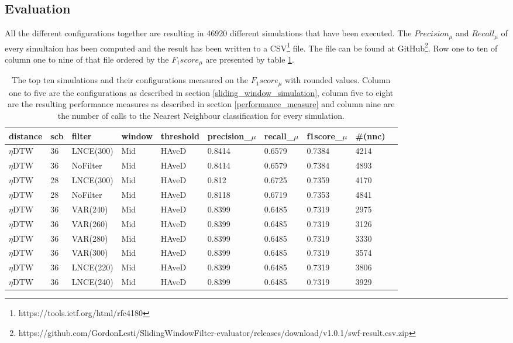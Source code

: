 \subsection{Evaluation} \label{evaluation}
All the different configurations together are resulting in 46920 different simulations that have been executed. The
$Precision_{\mu}$ and $Recall_{\mu}$ of every simultaion has been computed and the result has been written to a
CSV\footnote{https://tools.ietf.org/html/rfc4180} file. The file can be found at
GitHub\footnote{https://github.com/GordonLesti/SlidingWindowFilter-evaluator/releases/download/v1.0.1/swf-result.csv.zip}.
Row one to ten of column one to nine of that file ordered by the $F_{1}score_{\mu}$ are presented by table
\ref{tab:result}.

\begin{table}[H]
    \begin{center}
        \begin{tabular*}{\textwidth}{l @{\extracolsep{\fill}} lllllllll}
            \hline
            \textbf{distance} & \textbf{scb} & \textbf{filter} & \textbf{window} & \textbf{threshold} & \textbf{precision\_$\mu$} & \textbf{recall\_$\mu$} & \textbf{f1score\_$\mu$} & \textbf{\#(nnc)}\\
            \hline
            $\eta$DTW & 36 & LNCE(300) & Mid  & HAveD & 0.8414 & 0.6579 & 0.7384 & 4214\\
            $\eta$DTW & 36 & NoFilter & Mid  & HAveD & 0.8414 & 0.6579 & 0.7384 & 4893\\
            $\eta$DTW & 28 & LNCE(300) & Mid  & HAveD & 0.812 & 0.6725 & 0.7359 & 4170\\
            $\eta$DTW & 28 & NoFilter & Mid  & HAveD & 0.8118 & 0.6719 & 0.7353 & 4841\\
            $\eta$DTW & 36 & VAR(240) & Mid  & HAveD & 0.8399 & 0.6485 & 0.7319 & 2975\\
            $\eta$DTW & 36 & VAR(260) & Mid & HAveD & 0.8399 & 0.6485 & 0.7319 & 3126\\
            $\eta$DTW & 36 & VAR(280) & Mid & HAveD & 0.8399 & 0.6485 & 0.7319 & 3330\\
            $\eta$DTW & 36 & VAR(300) & Mid & HAveD & 0.8399 & 0.6485 & 0.7319 & 3574\\
            $\eta$DTW & 36 & LNCE(220) & Mid & HAveD & 0.8399 & 0.6485 & 0.7319 & 3806\\
            $\eta$DTW & 36 & LNCE(240) & Mid & HAveD & 0.8399 & 0.6485 & 0.7319 & 3929\\
            \hline
        \end{tabular*}
    \end{center}
    \caption{The top ten simulations and their configurations measured on the $F_{1}score_{\mu}$ with rounded values.
    Column one to five are the configurations as described in section \ref{sliding_window_simulation}, column five to
    eight are the resulting performance measures as described in section \ref{performance_measure} and column nine are
    the number of calls to the Nearest Neighbour classification for every simulation.}
	\label{tab:result}
\end{table}

